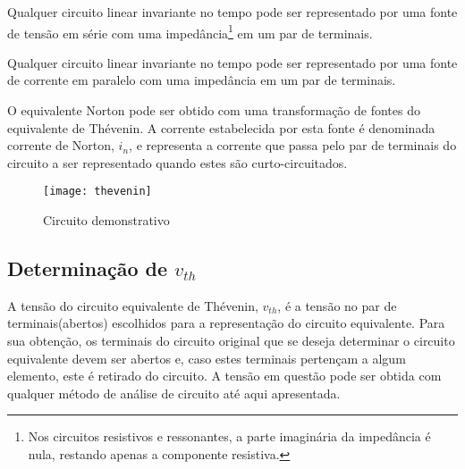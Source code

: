 \documentclass[12pt,fleqn]{book} %
\begin{document}
    \begin{theorem}
    Qualquer circuito linear invariante no tempo pode ser representado por uma fonte de tensão em série com uma impedância\footnote{Nos circuitos resistivos e ressonantes, a parte imaginária da impedância é nula, restando apenas a componente resistiva.} em um par de terminais.
    \end{theorem}

    \begin{theorem}
    Qualquer circuito linear invariante no tempo pode ser representado por uma fonte de corrente em paralelo com uma impedância em um par de terminais.
    \end{theorem}
    
  
    
    \begin{remark}
    O equivalente Norton pode ser obtido com uma transformação de fontes do equivalente de Thévenin. A corrente estabelecida por esta fonte é denominada corrente de Norton, $i_{n}$, e representa a corrente que passa pelo par de terminais do circuito a ser representado quando estes são curto-circuitados.
    \end{remark}
    

        \begin{figure}[!htbp] \centering\texttt{[image: thevenin]}
            \caption{Circuito demonstrativo}\label{thevenin} 
        \end{figure}

    \subsection{Determinação de $v_{th}$}
    
      A tensão do circuito equivalente de Thévenin, $v_{th}$, é a tensão no par de terminais(abertos) escolhidos para a representação do circuito equivalente. Para sua obtenção, os terminais do circuito original que se deseja determinar o circuito equivalente devem ser abertos e, caso estes terminais pertençam a algum elemento, este é retirado do circuito. A tensão em questão pode ser obtida com qualquer método de análise de circuito até aqui apresentada.
\end{document}
